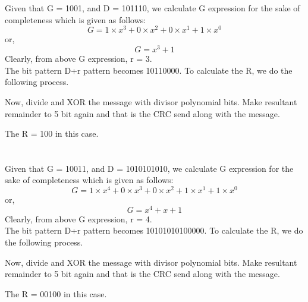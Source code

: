 \documentclass[12pt]{article}
\begin{document}

\section{}

Given that G = 1001, and D = 101110, we calculate G expression for the sake of completeness which is given as follows:
\begin{equation*}
    G = 1 \times x^3 + 0 \times x^2 + 0 \times x^1 + 1 \times x^0
\end{equation*}
or,
\begin{equation*}
    G = x^3 + 1
\end{equation*}
Clearly, from above G expression, r = 3. \\
The bit pattern D+r pattern becomes 10110000.
To calculate the R, we do the following process.

Now, divide and XOR the message with divisor polynomial bits. Make resultant remainder to 5 bit again and that is the CRC send along with the message.

The R = 100 in this case.


\section{}

Given that G = 10011, and D = 1010101010, we calculate G expression for the sake of completeness which is given as follows:
\begin{equation*}
    G = 1 \times x^4 + 0 \times x^3 + 0 \times x^2 + 1 \times x^1 + 1 \times x^0
\end{equation*}
or,
\begin{equation*}
    G = x^4 + x + 1
\end{equation*}
Clearly, from above G expression, r = 4. \\
The bit pattern D+r pattern becomes 10101010100000.
To calculate the R, we do the following process.

Now, divide and XOR the message with divisor polynomial bits. Make resultant remainder to 5 bit again and that is the CRC send along with the message.

The R = 00100 in this case.

\end{document}
